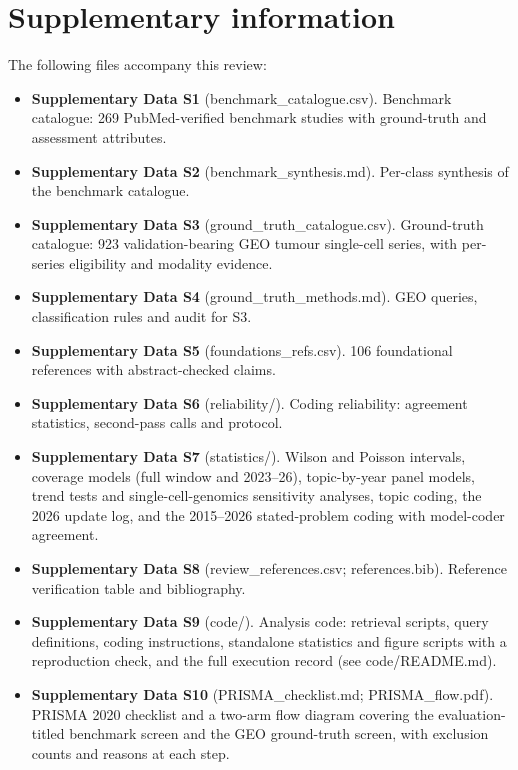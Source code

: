 \documentclass[11pt]{article}
\providecommand{\tightlist}{\setlength{\itemsep}{0pt}\setlength{\parskip}{0pt}}
\begin{document}
\section{Supplementary information}\label{supplementary-information}

The following files accompany this review:

\begin{itemize}
\tightlist
\item
  \textbf{Supplementary Data S1} (benchmark\_catalogue.csv). Benchmark
  catalogue: 269 PubMed-verified benchmark studies with ground-truth and
  assessment attributes.
\item
  \textbf{Supplementary Data S2} (benchmark\_synthesis.md). Per-class
  synthesis of the benchmark catalogue.
\item
  \textbf{Supplementary Data S3} (ground\_truth\_catalogue.csv).
  Ground-truth catalogue: 923 validation-bearing GEO tumour single-cell
  series, with per-series eligibility and modality evidence.
\item
  \textbf{Supplementary Data S4} (ground\_truth\_methods.md). GEO
  queries, classification rules and audit for S3.
\item
  \textbf{Supplementary Data S5} (foundations\_refs.csv). 106
  foundational references with abstract-checked claims.
\item
  \textbf{Supplementary Data S6} (reliability/). Coding reliability:
  agreement statistics, second-pass calls and protocol.
\item
  \textbf{Supplementary Data S7} (statistics/). Wilson and Poisson
  intervals, coverage models (full window and 2023--26), topic-by-year
  panel models, trend tests and single-cell-genomics sensitivity
  analyses, topic coding, the 2026 update log, and the 2015--2026
  stated-problem coding with model-coder agreement.
\item
  \textbf{Supplementary Data S8} (review\_references.csv;
  references.bib). Reference verification table and bibliography.
\item
  \textbf{Supplementary Data S9} (code/). Analysis code: retrieval
  scripts, query definitions, coding instructions, standalone statistics
  and figure scripts with a reproduction check, and the full execution
  record (see code/README.md).
\item
  \textbf{Supplementary Data S10} (PRISMA\_checklist.md;
  PRISMA\_flow.pdf). PRISMA 2020 checklist and a two-arm flow diagram
  covering the evaluation-titled benchmark screen and the GEO
  ground-truth screen, with exclusion counts and reasons at each step.
\end{itemize}
\end{document}
